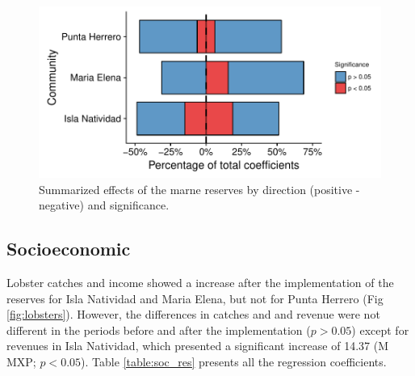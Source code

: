 \documentclass{frontiersSCNS}
\theoremstyle{definition}
\theoremstyle{definition}
\theoremstyle{definition}
\theoremstyle{remark}
\begin{document}
\begin{figure}
\centering
\includegraphics{Villasenor-Derbez_files/figure-latex/unnamed-chunk-6-1.pdf}
\caption{\label{fig:unnamed-chunk-6}\label{fig:res_com}Summarized effects of
the marne reserves by direction (positive - negative) and significance.}
\end{figure}

\subsection{Socioeconomic}\label{socioeconomic}

Lobster catches and income showed a increase after the implementation of
the reserves for Isla Natividad and Maria Elena, but not for Punta
Herrero (Fig \ref{fig:lobsters}). However, the differences in catches
and and revenue were not different in the periods before and after the
implementation (\(p > 0.05\)) except for revenues in Isla Natividad,
which presented a significant increase of 14.37 (M MXP; \(p<0.05\)).
Table \ref{table:soc_res} presents all the regression coefficients.
\end{document}
